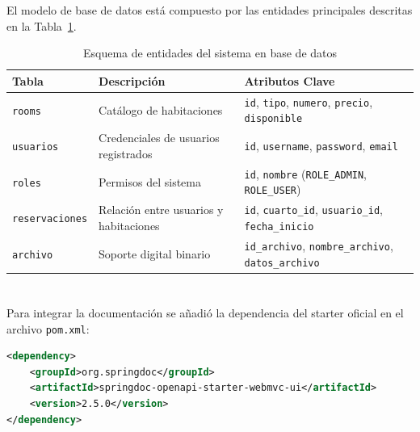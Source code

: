 \documentclass[10pt,a4paper]{article}
\begin{document}
\pagebreak

\section{\color{colorIPN}{Modelo de base de datos}}

El modelo de base de datos está compuesto por las entidades principales descritas en la Tabla~\ref{tabla:BaseDatos}.

\begin{table}[htb]
    \centering
    \begin{tabular}{p{3cm}|p{6cm}|p{4cm}}\hline \hline
        Tabla     & Descripción  & Atributos Clave \\ \hline \hline
        \texttt{rooms} & Catálogo de habitaciones & \texttt{id}, \texttt{tipo}, \texttt{numero}, \texttt{precio}, \texttt{disponible} \\ \hline
        \texttt{usuarios} & Credenciales de usuarios registrados & \texttt{id}, \texttt{username}, \texttt{password}, \texttt{email} \\ \hline
        \texttt{roles} & Permisos del sistema & \texttt{id}, \texttt{nombre} (\texttt{ROLE\_ADMIN}, \texttt{ROLE\_USER}) \\ \hline
        \texttt{reservaciones} & Relación entre usuarios y habitaciones & \texttt{id}, \texttt{cuarto\_id}, \texttt{usuario\_id}, \texttt{fecha\_inicio} \\ \hline
        \texttt{archivo} & Soporte digital binario & \texttt{id\_archivo}, \texttt{nombre\_archivo}, \texttt{datos\_archivo} \\ \hline \hline
    \end{tabular}
    \caption{Esquema de entidades del sistema en base de datos}
    \label{tabla:BaseDatos}
\end{table}

\pagebreak

\section{\color{colorIPN}{Desarrollo}}

\subsection{\textit{\color{colorESCOM}{Configuración del Proyecto y Dependencias}}}
Para integrar la documentación se añadió la dependencia del starter oficial en el archivo \texttt{pom.xml}:
\begin{lstlisting}[language=XML]
<dependency>
    <groupId>org.springdoc</groupId>
    <artifactId>springdoc-openapi-starter-webmvc-ui</artifactId>
    <version>2.5.0</version>
</dependency>
\end{lstlisting}
\end{document}
